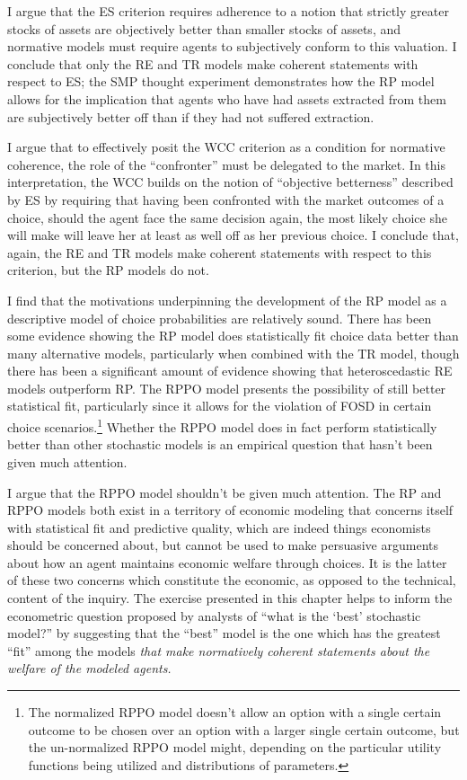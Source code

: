 \documentclass[../main.tex]{subfiles}
\begin{document}
I argue that the ES criterion requires adherence to a notion that strictly greater stocks of assets are objectively better than smaller stocks of assets, and normative models must require agents to subjectively conform to this valuation.
I conclude that only the RE and TR models make coherent statements with respect to ES; the SMP thought experiment demonstrates how the RP model allows for the implication that agents who have had assets extracted from them are subjectively better off than if they had not suffered extraction.

I argue that to effectively posit the WCC criterion as a condition for normative coherence, the role of the \enquote{confronter} must be delegated to the market.
In this interpretation, the WCC builds on the notion of \enquote{objective betterness} described by ES by requiring that having been confronted with the market outcomes of a choice, should the agent face the same decision again, the most likely choice she will make will leave her at least as well off as her previous choice.
I conclude that, again, the RE and TR models make coherent statements with respect to this criterion, but the RP models do not.

I find that the motivations underpinning the development of the RP model as a descriptive model of choice probabilities are relatively sound.
There has been some evidence showing the RP model does statistically fit choice data better than many alternative models, particularly when combined with the TR model, though there has been a significant amount of evidence showing that heteroscedastic RE models outperform RP.
The RPPO model presents the possibility of still better statistical fit, particularly since it allows for the violation of FOSD in certain choice scenarios.\footnote{
	The normalized RPPO model doesn't allow an option with a single certain outcome to be chosen over an option with a larger single certain outcome, but the un-normalized RPPO model might, depending on the particular utility functions being utilized and distributions of parameters.
}
Whether the RPPO model does in fact perform statistically better than other stochastic models is an empirical question that hasn't been given much attention.

I argue that the RPPO model shouldn't be given much attention.
The RP and RPPO models both exist in a territory of economic modeling that concerns itself with statistical fit and predictive quality, which are indeed things economists should be concerned about, but cannot be used to make persuasive arguments about how an agent maintains economic welfare through choices.
It is the latter of these two concerns which constitute the economic, as opposed to the technical, content of the inquiry.
The exercise presented in this chapter helps to inform the econometric question proposed by analysts of \enquote{what is the \enquote{best} stochastic model?} by suggesting that the \enquote{best} model is the one which has the greatest \enquote{fit} among the models \textit{that make normatively coherent statements about the welfare of the modeled agents.}
\end{document}
